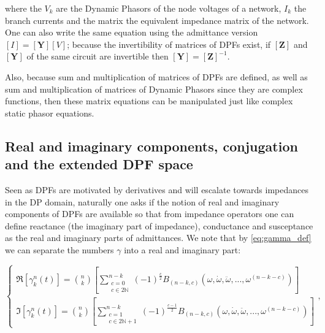 	\noindent where the $V_k$ are the Dynamic Phasors of the node voltages of a network, $I_k$ the branch currents and the matrix the equivalent impedance matrix of the network. One can also write the same equation using the admittance version $\left[I\right] = \left[\mathbf{Y}\right]\left[V\right]$; because the invertibility of matrices of DPFs exist, if $\left[\mathbf{Z}\right]$ and $\left[\mathbf{Y}\right]$ of the same circuit are invertible then $\left[\mathbf{Y}\right] = \left[\mathbf{Z}\right]^{-1}$.

	Also, because sum and multiplication of matrices of DPFs are defined, as well as sum and multiplication of matrices of Dynamic Phasors since they are complex functions, then these matrix equations can be manipulated just like complex static phasor equations.

\subsection{Real and imaginary components, conjugation and the extended DPF space} \label{subsec:real_imag_dpfs}
	
	Seen as DPFs are motivated by derivatives and will escalate towards impedances in the DP domain, naturally one asks if the notion of real and imaginary components of DPFs are available so that from impedance operators one can define reactance (the imaginary part of impedance), conductance and susceptance as the real and imaginary parts of admittances. We note that by \eqref{eq:gamma_def} we can separate the numbers $\gamma$ into a real and imaginary part:

\begin{equation} \left\{\begin{array}{l} \Re\left[\gamma_k^n(t)\right] = \displaystyle {n\choose k} \left[\sum\limits_{\substack{ c=0 \\ c\in 2\mathbb{N}}}^{n-k} \left(-1\right)^{\frac{c}{2}} B_{\left(n-k,c\right)}\left(\omega,\dot{\omega},\ddot{\omega},...,\omega^{(n-k-c)}\right) \right]\\[10mm] \Im\left[\gamma_k^n(t)\right] = \displaystyle {n\choose k} \left[\sum\limits_{\substack{ c=1 \\ c\in 2\mathbb{N}+1}}^{n-k} \left(-1\right)^{\frac{c-1}{2}} B_{\left(n-k,c\right)}\left(\omega,\dot{\omega},\ddot{\omega},...,\omega^{(n-k-c)}\right) \right]\end{array}\right. ,\label{eq:gamma_def_imre}\end{equation}

